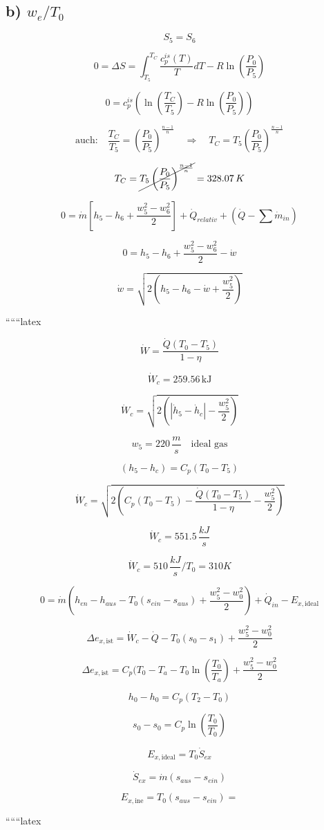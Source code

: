 \subsection*{b) \( w_e / T_0 \)}

\[
S_5 = S_6
\]

\[
0 = \Delta S = \int_{T_5}^{T_C} \frac{c_p^{is}(T)}{T} dT - R \ln \left( \frac{P_0}{P_5} \right)
\]

\[
0 = c_p^{is} \left( \ln \left( \frac{T_C}{T_5} \right) - R \ln \left( \frac{P_0}{P_5} \right) \right)
\]

\[
\text{auch:} \quad \frac{T_C}{T_5} = \left( \frac{P_0}{P_5} \right)^{\frac{n-1}{n}} \quad \Rightarrow \quad T_C = T_5 \left( \frac{P_0}{P_5} \right)^{\frac{n-1}{n}}
\]

\[
T_C = \cancel{T_5 \left( \frac{P_0}{P_5} \right)^{\frac{n-1}{n}}} = 328.07 \, K
\]

\[
0 = \dot{m} \left[ h_5 - h_6 + \frac{w_5^2 - w_6^2}{2} \right] + \dot{Q}_{relativ} + \left( \dot{Q} - \sum \dot{m}_{in} \right)
\]

\[
0 = h_5 - h_6 + \frac{w_5^2 - w_6^2}{2} - \dot{w}
\]

\[
\dot{w} = \sqrt{2 \left( h_5 - h_6 - \dot{w} + \frac{w_5^2}{2} \right)}
\]

``````latex

\[
\dot{W} = \frac{\dot{Q} (T_0 - T_5)}{1 - \eta}
\]

\[
\dot{W}_c = 259.56 \, \text{kJ}
\]

\[
\dot{W}_c = \sqrt{2 \left( \left| \dot{h}_5 - \dot{h}_c \right| - \frac{w_{5}^2}{2} \right)}
\]

\[
w_{5} = 220 \, \frac{m}{s} \quad \text{ideal gas}
\]

\[
(h_5 - h_c) = C_p (T_0 - T_5)
\]

\[
\dot{W}_c = \sqrt{2 \left( C_p (T_0 - T_5) - \frac{\dot{Q} (T_0 - T_5)}{1 - \eta} - \frac{w_{5}^2}{2} \right)}
\]

\[
\dot{W}_c = 551.5 \, \frac{kJ}{s}
\]

\[
\dot{W}_c = 510 \, \frac{kJ}{s} / T_0 = 310 K
\]

\[
0 = \dot{m} \left( h_{en} - h_{aus} - T_0 (s_{ein} - s_{aus}) + \frac{w_{5}^2 - w_{0}^2}{2} \right) + \dot{Q}_{in} - E_{x, \text{ideal}}
\]

\[
\Delta e_{x, \text{ist}} = \dot{W}_c - \dot{Q} - T_0 (s_0 - s_1) + \frac{w_{5}^2 - w_{0}^2}{2}
\]

\[
\Delta e_{x, \text{ist}} = C_p (T_0 - T_a - T_0 \ln \left( \frac{T_0}{T_a} \right) + \frac{w_{5}^2 - w_{0}^2}{2}
\]

\[
h_0 - h_0 = C_p (T_2 - T_0)
\]

\[
s_0 - s_0 = C_p \ln \left( \frac{T_0}{T_0} \right)
\]

\[
E_{x, \text{ideal}} = T_0 \dot{S}_{ex}
\]

\[
\dot{S}_{ex} = \dot{m} (s_{aus} - s_{ein})
\]

\[
E_{x, \text{ine}} = T_0 (s_{aus} - s_{ein}) =
\]

``````latex